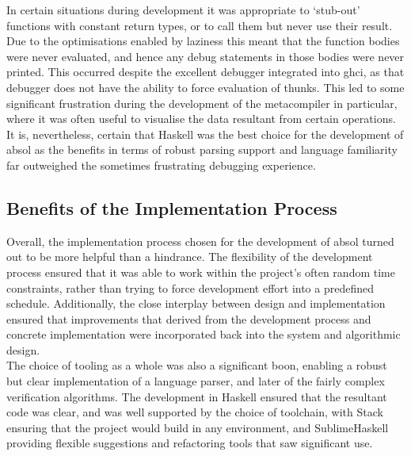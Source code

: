 In certain situations during development it was appropriate to `stub-out' functions with constant return types, or to call them but never use their result.
Due to the optimisations enabled by laziness this meant that the function bodies were never evaluated, and hence any debug statements in those bodies were never printed. 
This occurred despite the excellent debugger integrated into \gls{ghci}, as that debugger does not have the ability to force evaluation of thunks.
This led to some significant frustration during the development of the metacompiler in particular, where it was often useful to visualise the data resultant from certain operations. \\

It is, nevertheless, certain that Haskell was the best choice for the development of \gls{absol} as the benefits in terms of robust parsing support and language familiarity far outweighed the sometimes frustrating debugging experience. 



\subsection{Benefits of the Implementation Process} %
\label{sub:benefits_of_the_implementation_process}
Overall, the implementation process chosen for the development of \gls{absol} turned out to be more helpful than a hindrance. 
The flexibility of the development process ensured that it was able to work within the project's often random time constraints, rather than trying to force development effort into a predefined schedule.
Additionally, the close interplay between design and implementation ensured that improvements that derived from the development process and concrete implementation were incorporated back into the system and algorithmic design. \\

The choice of tooling as a whole was also a significant boon, enabling a robust but clear implementation of a language parser, and later of the fairly complex verification algorithms.
The development in Haskell ensured that the resultant code was clear, and was well supported by the choice of toolchain, with Stack ensuring that the project would build in any environment, and SublimeHaskell providing flexible suggestions and refactoring tools that saw significant use. 

